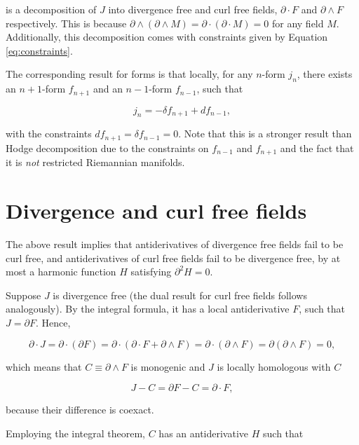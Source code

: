 \documentclass[twocolumn]{article}
\begin{document}
is a decomposition of $J$ into divergence free and curl free fields, $\partial \cdot F$ and $\partial \wedge F$ respectively. This is because $\partial \wedge (\partial \wedge M) = \partial \cdot (\partial \cdot M) = 0$ for any field $M$. Additionally, this decomposition comes with constraints given by Equation \ref{eq:constraints}.

The corresponding result for forms is that locally, for any $n$-form $j_n$, there exists an $n+1$-form $f_{n+1}$ and an $n-1$-form $f_{n-1}$, such that

\begin{equation}
  j_n = -\delta f_{n+1} + d f_{n-1},
\end{equation}

with the constraints $df_{n+1}=\delta f_{n-1} = 0$. Note that this is a stronger result than Hodge decomposition due to the constraints on $f_{n-1}$ and $f_{n+1}$ and the fact that it is \emph{not} restricted Riemannian manifolds.

\section{Divergence and curl free fields}

The above result implies that antiderivatives of divergence free fields fail to be curl free, and antiderivatives of curl free fields fail to be divergence free, by at most a harmonic function $H$ satisfying $\partial^2 H = 0$.

Suppose $J$ is divergence free (the dual result for curl free fields follows analogously). By the integral formula, it has a local antiderivative $F$, such that $J = \partial F$. Hence,

\begin{equation}
  \partial \cdot J = \partial \cdot (\partial F) = \partial \cdot (\partial \cdot F + \partial \wedge F) = \partial \cdot (\partial \wedge F) = \partial (\partial \wedge F) = 0,
\end{equation}

which means that $C \equiv \partial \wedge F$ is monogenic and $J$ is locally homologous with $C$

\begin{equation}
  J - C = \partial F - C = \partial \cdot F,\label{eq:homologous}
\end{equation}

because their difference is coexact.

Employing the integral theorem, $C$ has an antiderivative $H$ such that 
\end{document}
